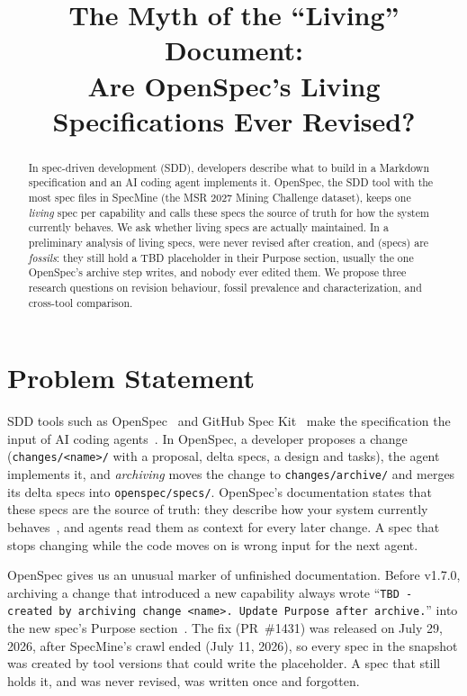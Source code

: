 \documentclass[10pt, conference]{IEEEtran}
\title{The Myth of the ``Living'' Document:\\Are OpenSpec's Living Specifications Ever Revised?}
\author{\IEEEauthorblockN{Tran Vo \quad Thanh Nghiep Quan}
\IEEEauthorblockA{\emph{Dep. of Computer and Software Engineering, Polytechnique Montr\'eal}, Montr\'eal, Canada}}
\newcommand{\fp}[1]{\texttt{#1}}
\begin{document}
\maketitle

\begin{abstract}
In spec-driven development (SDD), developers describe what to build in a Markdown
specification and an AI coding agent implements it. OpenSpec, the SDD tool with the most
spec files in SpecMine (the MSR 2027 Mining Challenge dataset), keeps one \emph{living} spec
per capability and calls these specs the source of truth for how the system currently behaves.
We ask whether living specs are actually maintained. In a preliminary analysis of
\numLiving living specs, \pctNeverRevised were never revised after creation, and
\pctFossil (\numFossils specs) are \emph{fossils}: they still hold a TBD placeholder in
their Purpose section, usually the one OpenSpec's archive step writes, and nobody ever
edited them.
We propose three research questions on revision behaviour, fossil prevalence and
characterization, and cross-tool comparison.
\end{abstract}

\section{Problem Statement}
\label{sec:statement}

SDD tools such as OpenSpec~\cite{openspec} and GitHub Spec Kit~\cite{speckit} make the
specification the input of AI coding agents~\cite{boeckeler2025}. In OpenSpec, a developer
proposes a change (\fp{changes/<name>/} with a proposal, delta specs, a design and tasks),
the agent implements it, and \emph{archiving} moves the change to \fp{changes/archive/}
and merges its delta specs into \fp{openspec/specs/}. OpenSpec's documentation states that
these specs are the source of truth: they describe how your system currently
behaves~\cite{openspec}, and agents read them as context for every later change. A spec
that stops changing while the code moves on is wrong input for the next agent.

OpenSpec gives us an unusual marker of unfinished documentation. Before v1.7.0, archiving a
change that introduced a new capability always wrote
``\texttt{TBD - created by archiving change <name>. Update Purpose after archive.}'' into the
new spec's Purpose section~\cite{openspec_pr1431}. The fix (PR~\#1431) was released on
July 29, 2026, after SpecMine's crawl ended (July 11, 2026), so every spec in the snapshot
was created by tool versions that could write the placeholder. A spec that still holds it,
and was never revised, was written once and forgotten.
\end{document}
